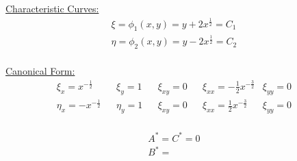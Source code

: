 \documentclass{article}
\begin{document}
\quad \underline{Characteristic Curves:}
\begin{align*}
  &\xi = \phi_1(x, y) = y + 2x^{\frac{1}{2}} = C_1 &&\\
  &\eta = \phi_2(x, y) = y - 2x^{\frac{1}{2}} = C_2 &&\\
\end{align*}

\quad \underline{Canonical Form:}
\begin{align*}
  &\xi_x = x^{-\frac{1}{2}} &&\xi_y = 1 &&\xi_{xy} = 0 &&\xi_{xx} = -\frac{1}{2} x^{-\frac{3}{2}}&\xi_{yy} = 0 &&\\
  &\eta_x = -x^{-\frac{1}{2}} &&\eta_y = 1 &&\xi_{xy} = 0 &&\xi_{xx} = \frac{1}{2} x^{-\frac{3}{2}}&\xi_{yy} = 0 &&\\
\end{align*}

\begin{align*}
  &A^* = C^* = 0 &&\\
  &B^* = 
\end{align*}








\end{document}
